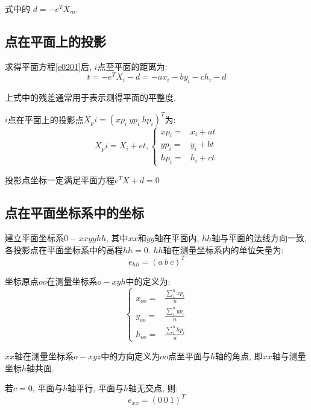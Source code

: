 式中的 $d=-e^TX_m$.

\subsection{点在平面上的投影}
求得平面方程\eqref{e0201}后, $i$点至平面的距离为:
\begin{equation}
    t = -e^TX_i-d = -ax_i-by_i-ch_i-d
\end{equation}

上式中的残差通常用于表示测得平面的平整度.

$i$点在平面上的投影点$X_pi=(xp_i\ yp_i\ hp_i)^T$为:
\begin{equation}
    X_pi=X_i+et,
    \left\{
    \begin{array}{rl}
        xp_i = & x_i + at \\
        yp_i = & y_i + bt \\
        hp_i = & h_i + ct 
    \end{array}
    \right.
\end{equation}

投影点坐标一定满足平面方程$e^{T}X+d=0$

\subsection{点在平面坐标系中的坐标}
建立平面坐标系$0-xxyyhh$, 其中$xx$和$yy$轴在平面内, $hh$轴与平面的法线方向一致, 各投影点在平面坐标系中的高程$hh=0$. $hh$轴在测量坐标系内的单位矢量为:
\begin{equation}
    e_{hh} = (a\ b\ c)^T
\end{equation}

坐标原点$oo$在测量坐标系$o-xyh$中的定义为:
\begin{equation}
\left\{
    \begin{array}{rl}
        x_{oo} = & \tfrac{\sum_{1}^{n}xp_i}{n} \\
        y_{oo} = & \tfrac{\sum_{1}^{n}yp_i}{n} \\
        h_{oo} = & \tfrac{\sum_{1}^{n}hp_i}{n}
    \end{array}
\right.
\end{equation}

$xx$轴在测量坐标系$o-xyz$中的方向定义为$oo$点至平面与$h$轴的角点, 即$xx$轴与测量坐标$h$轴共面.

若$c=0$, 平面与$h$轴平行, 平面与$h$轴无交点, 则:
\begin{equation}
    e_{xx}=(0\ 0\ 1)^T
\end{equation}

